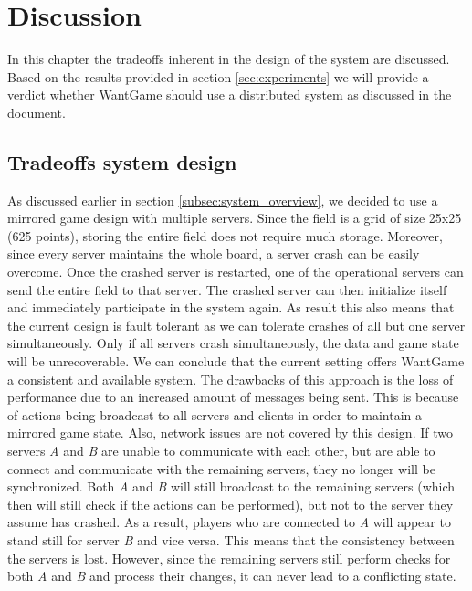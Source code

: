 \section{Discussion}


	In this chapter the tradeoffs inherent in the design of the system are discussed. Based on the results provided in section \ref{sec:experiments} we will provide a verdict whether WantGame should use a distributed system as discussed in the document.
	
	
	\subsection{Tradeoffs system design}
	\label{subsec:tradeoffs_system_design}
		As discussed earlier in section \ref{subsec:system_overview}, we decided to use a mirrored game design with multiple servers. 
		Since the field is a grid of size 25x25 (625 points), storing the entire field does not require much storage. 
		Moreover, since every server maintains the whole board, a server crash can be easily overcome.
		Once the crashed server is restarted, one of the operational servers can send the entire field to that server. 
		The crashed server can then initialize itself and immediately participate in the system again. 
		As result this also means that the current design is fault tolerant as we can tolerate crashes of all but one server simultaneously. 
		Only if all servers crash simultaneously, the data and game state will be unrecoverable.
		We can conclude that the current setting offers WantGame a consistent and available system. 
		The drawbacks of this approach is the loss of performance due to an increased amount of messages being sent. 
		This is because of actions being broadcast to all servers and clients in order to maintain a mirrored game state. 
		Also, network issues are not covered by this design. 
		If two servers \emph{A} and \emph{B} are unable to communicate with each other, but are able to connect and communicate with the remaining servers, they no longer will be synchronized. 
		Both \emph{A} and \emph{B} will still broadcast to the remaining servers (which then will still check if the actions can be performed), but not to the server they assume has crashed. 
		As a result, players who are connected to \emph{A} will appear to stand still for server \emph{B} and vice versa. This means that the consistency between the servers is lost. However, since the remaining servers still perform checks for both \emph{A} and \emph{B} and process their changes, it can never lead to a conflicting state.
	
